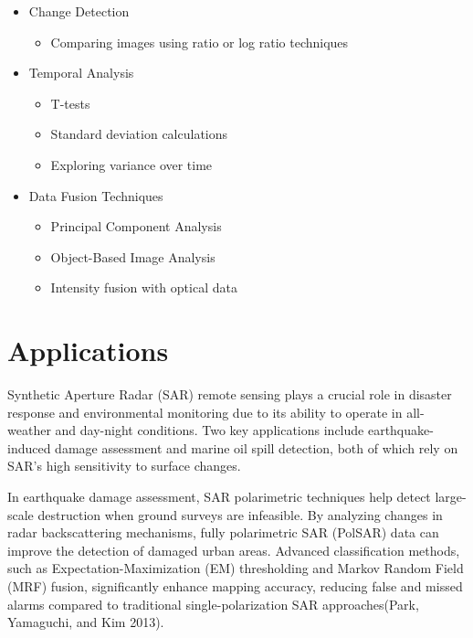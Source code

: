 \documentclass[
  letterpaper,
]{scrbook}
\providecommand{\tightlist}{%
  \setlength{\itemsep}{0pt}\setlength{\parskip}{0pt}}\usepackage{longtable,booktabs,array}
\begin{document}
\begin{itemize}
\item
  Change Detection

  \begin{itemize}
  \tightlist
  \item
    Comparing images using ratio or log ratio techniques
  \end{itemize}
\item
  Temporal Analysis

  \begin{itemize}
  \item
    T-tests
  \item
    Standard deviation calculations
  \item
    Exploring variance over time
  \end{itemize}
\item
  Data Fusion Techniques

  \begin{itemize}
  \item
    Principal Component Analysis
  \item
    Object-Based Image Analysis
  \item
    Intensity fusion with optical data
  \end{itemize}
\end{itemize}

\section{Applications}\label{applications-6}

Synthetic Aperture Radar (SAR) remote sensing plays a crucial role in
disaster response and environmental monitoring due to its ability to
operate in all-weather and day-night conditions. Two key applications
include earthquake-induced damage assessment and marine oil spill
detection, both of which rely on SAR's high sensitivity to surface
changes.

In earthquake damage assessment, SAR polarimetric techniques help detect
large-scale destruction when ground surveys are infeasible. By analyzing
changes in radar backscattering mechanisms, fully polarimetric SAR
(PolSAR) data can improve the detection of damaged urban areas. Advanced
classification methods, such as Expectation-Maximization (EM)
thresholding and Markov Random Field (MRF) fusion, significantly enhance
mapping accuracy, reducing false and missed alarms compared to
traditional single-polarization SAR approaches(Park, Yamaguchi, and Kim
2013).
\end{document}
